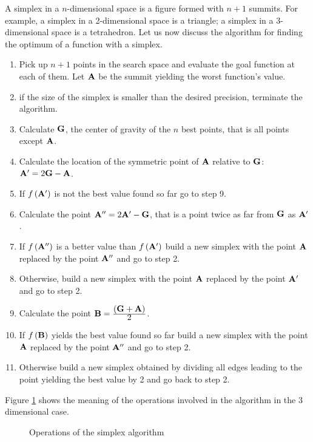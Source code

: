 \documentclass[twoside]{book}
\begin{document}
A simplex in a $n$-dimensional space is a figure formed with $n+1$
summits. For example, a simplex in a 2-dimensional space is a
triangle; a simplex in a 3- dimensional space is a tetrahedron.
Let us now discuss the algorithm for finding the optimum of a
function with a simplex.
\begin{enumerate}
  \item Pick up $n+1$ points in the search space and evaluate
  the goal function at each of them. Let ${\bf A}$ be the summit
  yielding the worst function's value.
  \item if the size of the simplex is smaller than the desired
  precision, terminate the algorithm.
  \item Calculate ${\bf G}$, the center of gravity of the $n$ best points,
  that is all points except ${\bf A}$.
  \item Calculate the location of the symmetric point of ${\bf A}$
  relative to ${\bf G}$: ${\bf A}^{\prime}=2{\bf G}-{\bf A}$.
  \item If $f\left({\bf A}^{\prime}\right)$ is not the best value
  found so far go to step 9.
  \item Calculate the point ${\bf A}^{\prime\prime}=2{\bf A}^{\prime}-{\bf
  G}$, that is a point twice as far from ${\bf G}$ as ${\bf
  A}^{\prime}$.
  \item If $f\left({\bf A}^{\prime\prime}\right)$ is a
  better value than $f\left({\bf A}^{\prime}\right)$ build a new
  simplex with the point ${\bf A}$ replaced by the point ${\bf
  A}^{\prime\prime}$ and go to step 2.
  \item Otherwise, build a new
  simplex with the point ${\bf A}$ replaced by the point ${\bf
  A}^{\prime}$ and go to step 2.
  \item Calculate the point ${\bf B}= {\displaystyle\left({\bf G}+{\bf
A}\right)\over\displaystyle 2}$.
  \item If $f\left({\bf B}\right)$ yields the best value found so far
  build a new simplex with the point ${\bf A}$ replaced by the point ${\bf
  A}^{\prime\prime}$ and go to step 2.
  \item Otherwise build a new simplex obtained by dividing all
  edges leading to the point yielding the best value by 2 and go
  back to step 2.
\end{enumerate}
Figure \ref{fig:simplexsample} shows the meaning of the operations
involved in the algorithm in the 3 dimensional case.
\begin{figure}
\center{}
\caption{Operations of the simplex
algorithm}\label{fig:simplexsample}
\end{figure}
\end{document}
